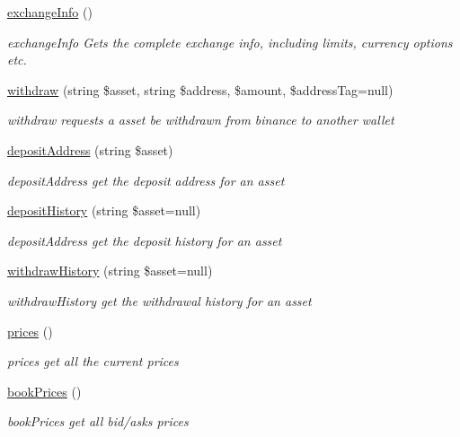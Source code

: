 \begin{DoxyCompactItemize}
\hyperlink{classBinance_1_1API_a944f676d29829384ea8eca179fe9ca5a}{exchange\-Info} ()
\begin{DoxyCompactList}\small\item\em exchange\-Info Gets the complete exchange info, including limits, currency options etc. \end{DoxyCompactList}\item 
\hyperlink{classBinance_1_1API_ab69047e208ca2a148f97120d518ecd3e}{withdraw} (string \$asset, string \$address, \$amount, \$address\-Tag=null)
\begin{DoxyCompactList}\small\item\em withdraw requests a asset be withdrawn from binance to another wallet \end{DoxyCompactList}\item 
\hyperlink{classBinance_1_1API_a40614aa2f9799c1197919812b37e6061}{deposit\-Address} (string \$asset)
\begin{DoxyCompactList}\small\item\em deposit\-Address get the deposit address for an asset \end{DoxyCompactList}\item 
\hyperlink{classBinance_1_1API_a0d353a3fe6f6fd28aa2177fc170d9f8b}{deposit\-History} (string \$asset=null)
\begin{DoxyCompactList}\small\item\em deposit\-Address get the deposit history for an asset \end{DoxyCompactList}\item 
\hyperlink{classBinance_1_1API_ae189e805dbb408560e539a94d44c63b0}{withdraw\-History} (string \$asset=null)
\begin{DoxyCompactList}\small\item\em withdraw\-History get the withdrawal history for an asset \end{DoxyCompactList}\item 
\hyperlink{classBinance_1_1API_a718271dc0691ae3a1f60dc0e7ad89698}{prices} ()
\begin{DoxyCompactList}\small\item\em prices get all the current prices \end{DoxyCompactList}\item 
\hyperlink{classBinance_1_1API_aa1e851e6a5fe2e01f7c5493fa9b90c97}{book\-Prices} ()
\begin{DoxyCompactList}\small\item\em book\-Prices get all bid/asks prices \end{DoxyCompactList}\item 

\end{DoxyCompactItemize}
